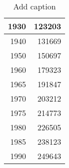 \begin{table}[htbp]
  \centering
  \caption{Add caption}
    \begin{tabular}{rr}
    \toprule
    1930  & 123203 \\
    \midrule
    1940  & 131669 \\
    1950  & 150697 \\
    1960  & 179323 \\
    1965  & 191847 \\
    1970  & 203212 \\
    1975  & 214773 \\
    1980  & 226505 \\
    1985  & 238123 \\
    1990  & 249643 \\
    \bottomrule
    \end{tabular}%
  \label{tab:addlabel}%
\end{table}%
